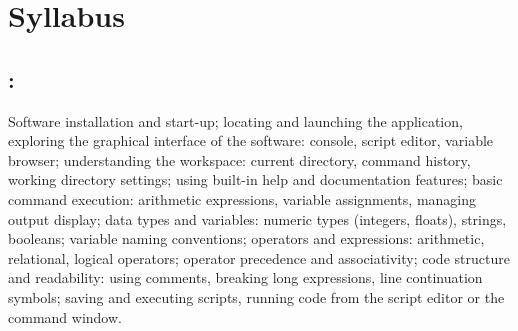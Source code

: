 \section*{Syllabus}

    \subsection*{\topicSubTitle: \topicTitle}
        Software
        installation and start-up; locating and launching the application, exploring the %
        graphical interface of the software: console, %
        script editor,
        variable browser; understanding the workspace: current directory, command history, working directory settings; using built-in help and documentation features; basic command execution: arithmetic expressions, variable assignments, managing output display; data types and variables: numeric types (integers, floats), strings, booleans; variable naming conventions; operators and expressions: arithmetic, relational, logical operators; operator precedence and associativity; code structure and readability: using comments, breaking long expressions, line continuation symbols; saving and executing scripts, %
        running code from %
        the script editor
        or the command window.